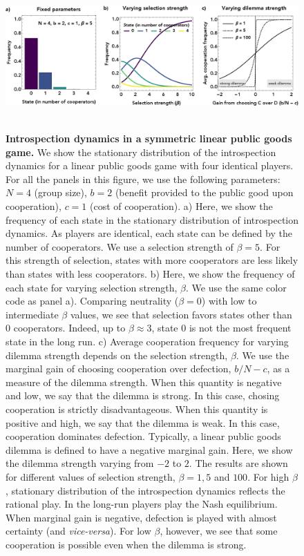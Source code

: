 \documentclass[11pt]{article}
\theoremstyle{plainCl1}
\theoremstyle{plainCl2}
\begin{document}
\begin{figure}
\centering
\includegraphics[width =  \textwidth]{figures/figure1.eps}~\\[0.4cm]
\caption{\onehalfspacing
\textbf{Introspection dynamics in a symmetric linear public goods game.}
We show the stationary distribution of the introspection dynamics for a linear public goods game with four identical players. For all the panels in this figure, we use the following parameters: $N = 4$ (group size), $b = 2$ (benefit provided to the public good upon cooperation), $c = 1$ (cost of cooperation). a) Here, we show the frequency of each state in the stationary distribution of introspection dynamics. As players are identical, each state can be defined by the number of cooperators. We use a selection strength of $\beta = 5$. For this strength of selection, states with more cooperators are less likely than states with less cooperators. b) Here, we show the frequency of each state for varying selection strength, $\beta$. We use the same color code as panel a). Comparing neutrality ($\beta = 0$) with low to intermediate $\beta$ values, we see that selection favors states other than 0 cooperators. Indeed, up to $\beta \approx 3$, state $0$ is not the most frequent state in the long run. c) Average cooperation frequency for varying dilemma strength depends on the selection strength, $\beta$. We use the marginal gain of choosing cooperation over defection, $b/N - c$, as a measure of the dilemma strength. When this quantity is negative and low, we say that the dilemma is strong. In this case, chosing cooperation is strictly disadvantageous. When this quantity is positive and high, we say that the dilemma is weak. In this case, cooperation dominates defection. Typically, a linear public goods dilemma is defined to have a negative marginal gain. Here, we show the dilemma strength varying from $-2$ to $2$. The results are shown for different values of selection strength, $\beta = 1, 5$ and $100$. For high $\beta$, stationary distribution of the introspection dynamics reflects the rational play. In the long-run players play the Nash equilibrium. When marginal gain is negative, defection is played with almost certainty (and \emph{vice-versa}). For low $\beta$, however, we see that some cooperation is possible even when the dilemma is strong. }
\label{Fig:LPGG-symmetric}
\end{figure}
\end{document}
